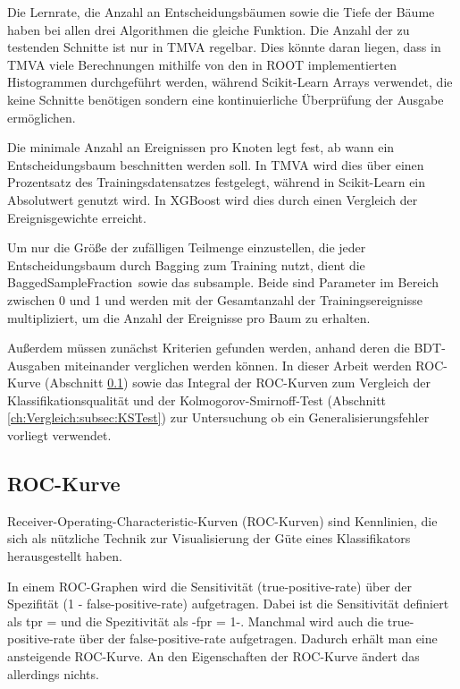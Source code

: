 Die Lernrate, die Anzahl an Entscheidungsb\"aumen sowie die Tiefe der B\"aume haben bei allen drei Algorithmen die gleiche Funktion. Die Anzahl der zu testenden Schnitte ist nur in TMVA regelbar. Dies k\"onnte daran liegen, dass in TMVA viele Berechnungen mithilfe von den in ROOT implementierten Histogrammen durchgef\"uhrt werden, w\"ahrend Scikit-Learn Arrays verwendet, die keine Schnitte ben\"otigen sondern eine kontinuierliche \"Uberpr\"ufung der Ausgabe erm\"oglichen. 

Die minimale Anzahl an Ereignissen pro Knoten legt fest, ab wann ein Entscheidungsbaum beschnitten werden soll. In TMVA wird dies \"uber einen Prozentsatz des Trainingsdatensatzes festgelegt, w\"ahrend in Scikit-Learn ein Absolutwert genutzt wird. In XGBoost wird dies durch einen Vergleich der Ereignisgewichte erreicht.

Um nur die Gr\"o\ss e der zuf\"alligen Teilmenge einzustellen, die jeder Entscheidungsbaum durch Bagging zum Training nutzt, dient die \glqq BaggedSampleFraction\grqq~sowie das \glqq subsample\grqq. Beide sind Parameter im Bereich zwischen 0 und 1 und werden mit der Gesamtanzahl der Trainingsereignisse multipliziert, um die Anzahl der Ereignisse pro Baum zu erhalten.

Au\ss erdem m\"ussen zun\"achst Kriterien gefunden werden, anhand deren die BDT-Ausgaben miteinander verglichen werden k\"onnen. In dieser Arbeit werden ROC-Kurve (Abschnitt \ref{ch:Vergleich:subsec:ROC}) sowie das Integral der ROC-Kurven zum Vergleich der Klassifikationsqualit\"at und der Kolmogorov-Smirnoff-Test (Abschnitt \ref{ch:Vergleich:subsec:KSTest}) zur Untersuchung ob ein Generalisierungsfehler vorliegt verwendet.

\subsection{ROC-Kurve}
\label{ch:Vergleich:subsec:ROC}

Receiver-Operating-Characteristic-Kurven (ROC-Kurven) sind Kennlinien, die sich als n\"utzliche Technik zur Visualisierung der G\"ute eines Klassifikators herausgestellt haben.

In einem ROC-Graphen wird die Sensitivit\"at (true-positive-rate) \"uber der Spezifit\"at (1 - false-positive-rate) aufgetragen. Dabei ist die Sensitivit\"at definiert als
\beq
tpr = 
\label{eq:TPR}
\eeq
und die Spezitivit\"at als
-fpr = 1-.
\label{eq:1-FPR}
\eeq
%
Manchmal wird auch die true-positive-rate \"uber der false-positive-rate aufgetragen. Dadurch erh\"alt man eine ansteigende ROC-Kurve. An den Eigenschaften der ROC-Kurve \"andert das allerdings nichts.

